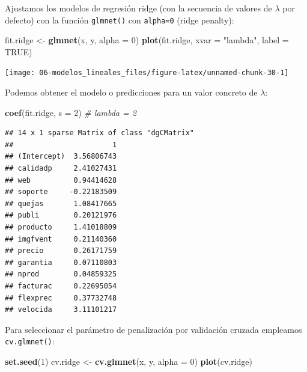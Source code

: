 \documentclass[
  spanish,
]{book}
\newenvironment{Shaded}{\begin{snugshade}}{\end{snugshade}}
\newcommand{\CommentTok}[1]{\textcolor[rgb]{0.56,0.35,0.01}{\textit{#1}}}
\newcommand{\DataTypeTok}[1]{\textcolor[rgb]{0.13,0.29,0.53}{#1}}
\newcommand{\DecValTok}[1]{\textcolor[rgb]{0.00,0.00,0.81}{#1}}
\newcommand{\KeywordTok}[1]{\textcolor[rgb]{0.13,0.29,0.53}{\textbf{#1}}}
\newcommand{\NormalTok}[1]{#1}
\newcommand{\OtherTok}[1]{\textcolor[rgb]{0.56,0.35,0.01}{#1}}
\newcommand{\StringTok}[1]{\textcolor[rgb]{0.31,0.60,0.02}{#1}}
\theoremstyle{break}
\theoremstyle{definition}
\theoremstyle{definition}
\theoremstyle{definition}
\theoremstyle{remark}
\begin{document}
Ajustamos los modelos de regresión ridge (con la secuencia de valores de \(\lambda\) por defecto) con la función \texttt{glmnet()} con \texttt{alpha=0} (ridge penalty):

\begin{Shaded}
\begin{Highlighting}[]
\NormalTok{fit.ridge <-}\StringTok{ }\KeywordTok{glmnet}\NormalTok{(x, y, }\DataTypeTok{alpha =} \DecValTok{0}\NormalTok{)}
\KeywordTok{plot}\NormalTok{(fit.ridge, }\DataTypeTok{xvar =} \StringTok{"lambda"}\NormalTok{, }\DataTypeTok{label =} \OtherTok{TRUE}\NormalTok{)}
\end{Highlighting}
\end{Shaded}

\begin{center}\texttt{[image: 06-modelos\_lineales\_files/figure-latex/unnamed-chunk-30-1]} \end{center}

Podemos obtener el modelo o predicciones para un valor concreto de \(\lambda\):

\begin{Shaded}
\begin{Highlighting}[]
\KeywordTok{coef}\NormalTok{(fit.ridge, }\DataTypeTok{s =} \DecValTok{2}\NormalTok{) }\CommentTok{# lambda = 2}
\end{Highlighting}
\end{Shaded}

\begin{verbatim}
## 14 x 1 sparse Matrix of class "dgCMatrix"
##                       1
## (Intercept)  3.56806743
## calidadp     2.41027431
## web          0.94414628
## soporte     -0.22183509
## quejas       1.08417665
## publi        0.20121976
## producto     1.41018809
## imgfvent     0.21140360
## precio       0.26171759
## garantia     0.07110803
## nprod        0.04859325
## facturac     0.22695054
## flexprec     0.37732748
## velocida     3.11101217
\end{verbatim}

Para seleccionar el parámetro de penalización por validación cruzada empleamos \texttt{cv.glmnet()}:

\begin{Shaded}
\begin{Highlighting}[]
\KeywordTok{set.seed}\NormalTok{(}\DecValTok{1}\NormalTok{)}
\NormalTok{cv.ridge <-}\StringTok{ }\KeywordTok{cv.glmnet}\NormalTok{(x, y, }\DataTypeTok{alpha =} \DecValTok{0}\NormalTok{)}
\KeywordTok{plot}\NormalTok{(cv.ridge)}
\end{Highlighting}
\end{Shaded}
\end{document}
